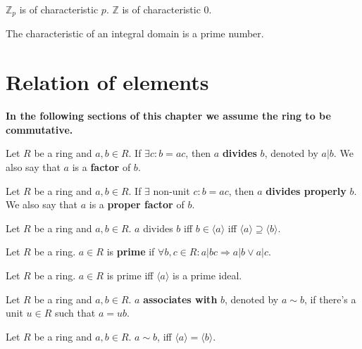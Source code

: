 \documentclass[12pt]{book}
\begin{document}
\begin{example}
	$\mathbb Z_p$ is of characteristic $p$. $\mathbb Z$ is of characteristic 0.
\end{example}

\begin{lemma}
	The characteristic of an integral domain is a prime number.
\end{lemma}

\section{Relation of elements}

{\bf In the following sections of this chapter we assume the ring to be commutative.}

\begin{definition}
	Let $R$ be a ring and $a,b\in R$. If $\exists c:b=ac$, then $a$ {\bf divides} $b$, denoted by $a|b$. We also say that $a$ is a {\bf factor} of $b$.
\end{definition}

\begin{definition}
	Let $R$ be a ring and $a,b\in R$. If $\exists $ non-unit $ c:b=ac$, then $a$ {\bf divides properly} $b$. We also say that $a$ is a {\bf proper factor} of $b$.
\end{definition}

\begin{lemma}
	Let $R$ be a ring and $a,b\in R$. $a$ divides $b$ iff $b\in\langle a\rangle$ iff $\langle a\rangle\supseteq\langle b\rangle$.
\end{lemma}

\begin{definition}
	Let $R$ be a ring. $a\in R$ is {\bf prime} if $\forall b,c\in R:a|bc\Rightarrow a|b\vee a|c$.
\end{definition}
\begin{lemma}
	Let $R$ be a ring. $a\in R$ is prime iff $\langle a\rangle$ is a prime ideal.
\end{lemma}

\begin{definition}
	Let $R$ be a ring and $a,b\in R$. $a$ {\bf associates with} $b$, denoted by $a\sim b$, if there's a unit $u\in R$ such that $a=ub$.
\end{definition}

\begin{lemma}
	Let $R$ be a ring and $a,b\in R$. $a\sim b$, iff $\langle a\rangle=\langle b\rangle$.
\end{lemma}
\end{document}
